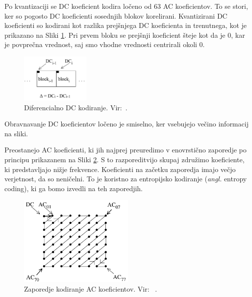 \documentclass[a4paper,12pt,openright]{book}
\begin{document}
Po kvantizaciji se DC koeficient kodira ločeno od 63 AC koeficientov. To se stori, ker so pogosto DC koeficienti sosednjih blokov korelirani. Kvantizirani DC koeficienti so kodirani kot razlika prejšnjega DC koeficienta in trenutnega, kot je prikazano na Sliki \ref{Diferencialno_kodiranje_DC}. Pri prvem bloku se prejšnji koeficient šteje kot da je 0, kar je povprečna vrednost, saj smo vhodne vrednosti centrirali okoli 0.
\begin{figure}[ht] %
\begin{center}
\includegraphics[width=0.3\textwidth]{slike/Diferencialno_kodiranje_DC.pdf}
\end{center}
\caption{Diferencialno DC kodiranje. Vir:~\cite{wallace1992jpeg}.}
\label{Diferencialno_kodiranje_DC}
\end{figure}
Obravnavanje DC koeficientov ločeno je smiselno, ker vsebujejo večino informacij na sliki. \par
Preostanejo AC koeficienti, ki jih najprej preuredimo v enovrstično zaporedje po principu prikazanem na Sliki \ref{zig_zag_zaporedje}. S to razporeditvijo skupaj združimo koeficiente, ki predstavljajo nižje frekvence. Koeficienti na začetku zaporedja imajo večjo verjetnost, da so neničelni. To je koristno za entropijsko kodiranje (\textit{angl.} entropy coding), ki ga bomo izvedli na teh zaporedjih.\par
\begin{figure}[ht] %
\begin{center}
\includegraphics[width=0.5\textwidth]{slike/zig_zag_zaporedje.pdf}
\end{center}
\caption{Zaporedje kodiranje AC koeficientov. Vir: ~\cite{wallace1992jpeg}.}
\label{zig_zag_zaporedje}
\end{figure}
\end{document}
